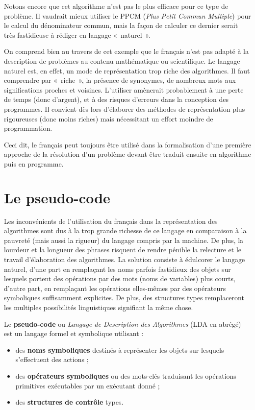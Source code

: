 		Notons encore que cet algorithme n’est pas le
		plus efficace pour ce type de problème. 
		Il vaudrait mieux utiliser le PPCM 
		(\textit{Plus Petit Commun Multiple}) 
		pour le calcul du dénominateur commun, mais la façon
		de calculer ce dernier serait très fastidieuse à rédiger en langage
		«~naturel~».

		On comprend bien au travers de cet exemple que
		le français n’est pas adapté à la description de problèmes au contenu
		mathématique ou scientifique. Le langage naturel est, en effet, un mode
		de représentation trop riche des algorithmes. Il faut comprendre par
		«~riche~», la présence de synonymes, de nombreux mots aux
		significations proches et voisines. L’utiliser amènerait probablement à
		une perte de temps (donc d’argent), et à des risques d’erreurs dans la
		conception des programmes. Il convient dès lors d’élaborer des méthodes
		de représentation plus rigoureuses (donc moins riches) mais nécessitant
		un effort moindre de programmation.

		Ceci dit, le français peut toujours être
		utilisé dans la formalisation d’une première approche de la résolution
		d’un problème devant être traduit ensuite en algorithme puis en
		programme.

	\section{Le pseudo-code}
	
		Les inconvénients de l’utilisation du français dans la représentation
		des algorithmes sont dus à la trop grande richesse de ce langage en
		comparaison à la pauvreté (mais aussi la rigueur) du langage compris
		par la machine. De plus, la lourdeur et la longueur des phrases
		risquent de rendre pénible la relecture et le travail d’élaboration des
		algorithmes. La solution consiste à édulcorer le langage naturel, d’une
		part en remplaçant les noms parfois fastidieux des objets sur lesquels
		portent des opérations par des mots (noms de variables) plus courts,
		d’autre part, en remplaçant les opérations elles-mêmes par des
		opérateurs symboliques suffisamment explicites. De plus, des structures
		types remplaceront les multiples possibilités linguistiques signifiant
		la même chose.

		Le \textbf{pseudo-code} ou \textit{Langage de Description des
		Algorithmes} (LDA en abrégé) est un langage formel et symbolique
		utilisant :

		\begin{itemize}
		\item
			des \textbf{noms symboliques} destinés à représenter les objets sur
			lesquels s’effectuent des actions ;
		\item
			des \textbf{opérateurs symboliques} ou des mots-clés traduisant les
			opérations primitives exécutables par un exécutant donné ;
		\item
			des \textbf{structures de contrôle} types.
		\end{itemize}

